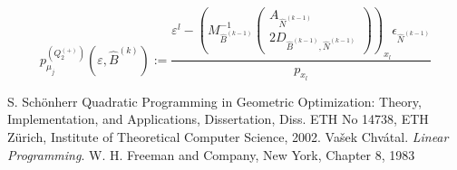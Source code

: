 \documentclass[a4paper]{article}
\newcommand{\pmu}[2]{\ensuremath{p_{\mu_{j}}^{(#1)}(\varepsilon, #2)}}
\begin{document}
\begin{equation}
\pmu{Q_{2}^{(+)}}{\hat{B}^{(k)}} :=
  \frac{\varepsilon^{l} -
         \left(M_{\hat{B}^{(k-1)}}^{-1}
           \left(\begin{array}{c}
                    A_{\hat{N}^{(k-1)}}  \\
	            \hline
	            2D_{\hat{B}^{(k-1)}, \hat{N}^{(k-1)}}
	         \end{array}
	   \right)
         \right)_{x_{l}}\epsilon_{\hat{N}^{(k-1)}}}{p_{x_{l}}}
\end{equation}

\begin{thebibliography}{99}
 S. Sch\"{o}nherr Quadratic Programming in Geometric Optimization:
Theory, Implementation, and Applications, Dissertation, Diss. ETH No 14738, ETH
Z\"{u}rich, Institute of Theoretical Computer Science, 2002.
 Va\v{s}ek Chv\'{a}tal. \textit{Linear Programming}. W. H. Freeman and Company,
New York, Chapter 8, 1983 
\end{thebibliography}
\end{document}
